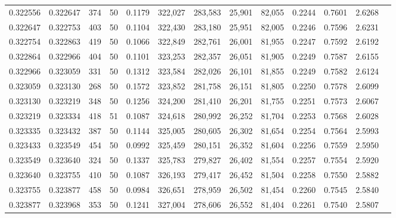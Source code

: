 \begin{tabular}{rrrrrrrrrrrrr}
0.322556 & 0.322647 &   374 &  50 &                                     0.1179 & 322,027 & 283,583 &  25,901 &  82,055 & 0.2244 & 0.7601 & 2.6268 \\
0.322647 & 0.322753 &   403 &  50 &                                     0.1104 & 322,430 & 283,180 &  25,951 &  82,005 & 0.2246 & 0.7596 & 2.6231 \\
0.322754 & 0.322863 &   419 &  50 &                                     0.1066 & 322,849 & 282,761 &  26,001 &  81,955 & 0.2247 & 0.7592 & 2.6192 \\
0.322864 & 0.322966 &   404 &  50 &                                     0.1101 & 323,253 & 282,357 &  26,051 &  81,905 & 0.2249 & 0.7587 & 2.6155 \\
0.322966 & 0.323059 &   331 &  50 &                                     0.1312 & 323,584 & 282,026 &  26,101 &  81,855 & 0.2249 & 0.7582 & 2.6124 \\
0.323059 & 0.323130 &   268 &  50 &                                     0.1572 & 323,852 & 281,758 &  26,151 &  81,805 & 0.2250 & 0.7578 & 2.6099 \\
0.323130 & 0.323219 &   348 &  50 &                                     0.1256 & 324,200 & 281,410 &  26,201 &  81,755 & 0.2251 & 0.7573 & 2.6067 \\
0.323219 & 0.323334 &   418 &  51 &                                     0.1087 & 324,618 & 280,992 &  26,252 &  81,704 & 0.2253 & 0.7568 & 2.6028 \\
0.323335 & 0.323432 &   387 &  50 &                                     0.1144 & 325,005 & 280,605 &  26,302 &  81,654 & 0.2254 & 0.7564 & 2.5993 \\
0.323433 & 0.323549 &   454 &  50 &                                     0.0992 & 325,459 & 280,151 &  26,352 &  81,604 & 0.2256 & 0.7559 & 2.5950 \\
0.323549 & 0.323640 &   324 &  50 &                                     0.1337 & 325,783 & 279,827 &  26,402 &  81,554 & 0.2257 & 0.7554 & 2.5920 \\
0.323640 & 0.323755 &   410 &  50 &                                     0.1087 & 326,193 & 279,417 &  26,452 &  81,504 & 0.2258 & 0.7550 & 2.5882 \\
0.323755 & 0.323877 &   458 &  50 &                                     0.0984 & 326,651 & 278,959 &  26,502 &  81,454 & 0.2260 & 0.7545 & 2.5840 \\
0.323877 & 0.323968 &   353 &  50 &                                     0.1241 & 327,004 & 278,606 &  26,552 &  81,404 & 0.2261 & 0.7540 & 2.5807 \\

\end{tabular}
